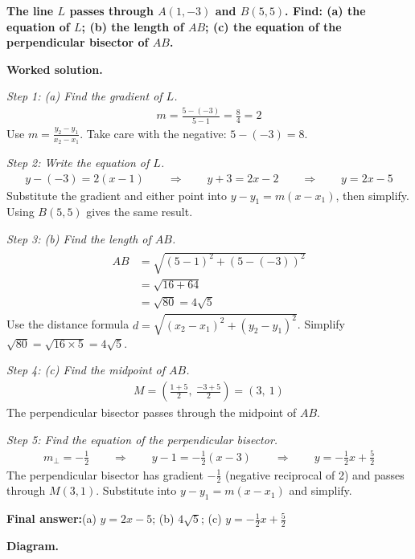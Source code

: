\documentclass[11pt]{article}
\newcommand{\question}[1]{\par\medskip\noindent\textbf{#1}\par}
\begin{document}
\question{The line \( L \) passes through \( A(1, -3) \) and \( B(5, 5) \). Find: (a) the equation of \( L \); (b) the length of \( AB \); (c) the equation of the perpendicular bisector of \( AB \).}

\textbf{Worked solution.}

\textit{Step 1: (a) Find the gradient of \(L\).}
\[\begin{gathered}
m = \frac{5-(-3)}{5-1} = \frac{8}{4} = 2
\end{gathered}\]
Use \(m = \frac{y_2 - y_1}{x_2 - x_1}\). Take care with the negative: \(5 - (-3) = 8\).

\textit{Step 2: Write the equation of \(L\).}
\[\begin{gathered}
y - (-3) = 2(x - 1) \quad\quad \Rightarrow \quad\quad y + 3 = 2x - 2 \quad\quad \Rightarrow \quad\quad y = 2x - 5
\end{gathered}\]
Substitute the gradient and either point into \(y - y_1 = m(x - x_1)\), then simplify. Using \(B(5, 5)\) gives the same result.

\textit{Step 3: (b) Find the length of \(AB\).}
\[\begin{gathered}
\begin{aligned} AB &= \sqrt{(5-1)^2 + (5-(-3))^2} \\ &= \sqrt{16 + 64} \\ &= \sqrt{80} = 4\sqrt{5} \end{aligned}
\end{gathered}\]
Use the distance formula \(d = \sqrt{(x_2 - x_1)^2 + (y_2 - y_1)^2}\). Simplify \(\sqrt{80} = \sqrt{16 \times 5} = 4\sqrt{5}\).

\textit{Step 4: (c) Find the midpoint of \(AB\).}
\[\begin{gathered}
M = \left(\frac{1+5}{2},\ \frac{-3+5}{2}\right) = (3,\ 1)
\end{gathered}\]
The perpendicular bisector passes through the midpoint of \(AB\).

\textit{Step 5: Find the equation of the perpendicular bisector.}
\[\begin{gathered}
m_{\perp} = -\frac{1}{2} \quad\quad \Rightarrow \quad\quad y - 1 = -\frac{1}{2}(x - 3) \quad\quad \Rightarrow \quad\quad y = -\frac{1}{2}x + \frac{5}{2}
\end{gathered}\]
The perpendicular bisector has gradient \(-\frac{1}{2}\) (negative reciprocal of 2) and passes through \(M(3, 1)\). Substitute into \(y - y_1 = m(x - x_1)\) and simplify.

\begin{answerbox}
\textbf{Final answer:}\quad (a) \(\displaystyle y = 2x - 5\); (b) \(\displaystyle 4\sqrt{5}\); (c) \(\displaystyle y = -\frac{1}{2}x + \frac{5}{2}\)
\end{answerbox}
\textbf{Diagram.}
\end{document}
